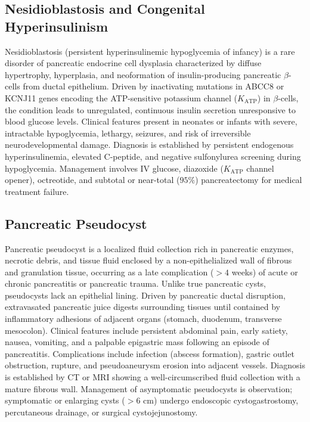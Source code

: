 \subsection{Nesidioblastosis and Congenital Hyperinsulinism}
\label{sec:Nesidioblastosis and Congenital Hyperinsulinism}
Nesidioblastosis (persistent hyperinsulinemic hypoglycemia of infancy) is a rare disorder of pancreatic endocrine cell dysplasia characterized by diffuse hypertrophy, hyperplasia, and neoformation of insulin-producing pancreatic $\beta$-cells from ductal epithelium. Driven by inactivating mutations in ABCC8 or KCNJ11 genes encoding the ATP-sensitive potassium channel ($K_{\text{ATP}}$) in $\beta$-cells, the condition leads to unregulated, continuous insulin secretion unresponsive to blood glucose levels. Clinical features present in neonates or infants with severe, intractable hypoglycemia, lethargy, seizures, and risk of irreversible neurodevelopmental damage. Diagnosis is established by persistent endogenous hyperinsulinemia, elevated C-peptide, and negative sulfonylurea screening during hypoglycemia. Management involves IV glucose, diazoxide ($K_{\text{ATP}}$ channel opener), octreotide, and subtotal or near-total ($95\%$) pancreatectomy for medical treatment failure.

\subsection{Pancreatic Pseudocyst}
\label{sec:Pancreatic Pseudocyst}
Pancreatic pseudocyst is a localized fluid collection rich in pancreatic enzymes, necrotic debris, and tissue fluid enclosed by a non-epithelialized wall of fibrous and granulation tissue, occurring as a late complication ($>4$ weeks) of acute or chronic pancreatitis or pancreatic trauma. Unlike true pancreatic cysts, pseudocysts lack an epithelial lining. Driven by pancreatic ductal disruption, extravasated pancreatic juice digests surrounding tissues until contained by inflammatory adhesions of adjacent organs (stomach, duodenum, transverse mesocolon). Clinical features include persistent abdominal pain, early satiety, nausea, vomiting, and a palpable epigastric mass following an episode of pancreatitis. Complications include infection (abscess formation), gastric outlet obstruction, rupture, and pseudoaneurysm erosion into adjacent vessels. Diagnosis is established by CT or MRI showing a well-circumscribed fluid collection with a mature fibrous wall. Management of asymptomatic pseudocysts is observation; symptomatic or enlarging cysts ($>6$ cm) undergo endoscopic cystogastrostomy, percutaneous drainage, or surgical cystojejunostomy.

